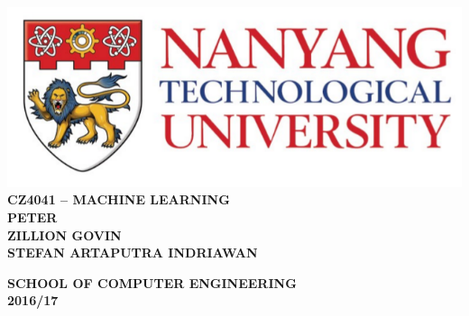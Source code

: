 \begin{titlepage}
	\begin{center}
		
		\includegraphics[width=1\textwidth]{./ntu_logo.png}
		\\[5cm]
		
		\uppercase{\textbf{CZ4041 -- MACHINE LEARNING}}
		\\[5cm]
		
		\uppercase{
			\textbf{
				PETER
				\\
				ZILLION GOVIN
				\\
				STEFAN ARTAPUTRA INDRIAWAN
		}}	
		
		\vfill
		
		\textsc{\bfseries SCHOOL OF COMPUTER ENGINEERING}
		\\
		\textbf{2016/17}
		
	\end{center}
\end{titlepage}